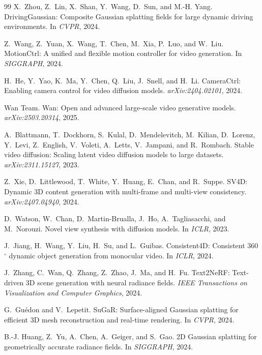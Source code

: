 \begin{thebibliography}{99}
X.~Zhou, Z.~Lin, X.~Shan, Y.~Wang, D.~Sun, and M.-H. Yang.
{DrivingGaussian}: Composite Gaussian splatting fields for large dynamic driving environments.
In \emph{CVPR}, 2024.

Z.~Wang, Z.~Yuan, X.~Wang, T.~Chen, M.~Xia, P.~Luo, and W.~Liu.
{MotionCtrl}: A unified and flexible motion controller for video generation.
In \emph{SIGGRAPH}, 2024.

H.~He, Y.~Yao, K.~Ma, Y.~Chen, Q.~Liu, J.~Snell, and H.~Li.
{CameraCtrl}: Enabling camera control for video diffusion models.
\emph{arXiv:2404.02101}, 2024.

{Wan Team}.
{Wan}: Open and advanced large-scale video generative models.
\emph{arXiv:2503.20314}, 2025.

A.~Blattmann, T.~Dockhorn, S.~Kulal, D.~Mendelevitch, M.~Kilian, D.~Lorenz, Y.~Levi, Z.~English, V.~Voleti, A.~Letts, V.~Jampani, and R.~Rombach.
Stable video diffusion: Scaling latent video diffusion models to large datasets.
\emph{arXiv:2311.15127}, 2023.

Z.~Xie, D.~Littlewood, T.~White, Y.~Huang, E.~Chan, and R.~Suppe.
{SV4D}: Dynamic 3{D} content generation with multi-frame and multi-view consistency.
\emph{arXiv:2407.04940}, 2024.

D.~Watson, W.~Chan, D.~Martin-Brualla, J.~Ho, A.~Tagliasacchi, and M.~Norouzi.
Novel view synthesis with diffusion models.
In \emph{ICLR}, 2023.

J.~Jiang, H.~Wang, Y.~Liu, H.~Su, and L.~Guibas.
{Consistent4D}: Consistent 360$^\circ$ dynamic object generation from monocular video.
In \emph{ICLR}, 2024.

J.~Zhang, C.~Wan, Q.~Zhang, Z.~Zhao, J.~Ma, and H.~Fu.
{Text2NeRF}: Text-driven 3{D} scene generation with neural radiance fields.
\emph{IEEE Transactions on Visualization and Computer Graphics}, 2024.

G.~Gu\'{e}don and V.~Lepetit.
{SuGaR}: Surface-aligned Gaussian splatting for efficient 3{D} mesh reconstruction and real-time rendering.
In \emph{CVPR}, 2024.

B.-J. Huang, Z.~Yu, A.~Chen, A.~Geiger, and S.~Gao.
2{D} Gaussian splatting for geometrically accurate radiance fields.
In \emph{SIGGRAPH}, 2024.


\end{thebibliography}
